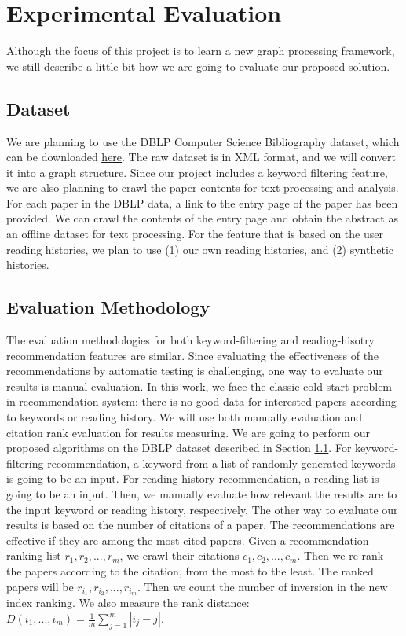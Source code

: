 \section{Experimental Evaluation}
%
Although the focus of this project is to learn a new graph processing framework, we still describe a little bit how we are going to evaluate our proposed solution.
%
\subsection{Dataset} \label{dataset}
%
We are planning to use the DBLP Computer Science Bibliography dataset, which can be downloaded \href{https://dblp.uni-trier.de/xml/}{\underline{here}}.
%
The raw dataset is in XML format, and we will convert it into a graph structure.
%
Since our project includes a keyword filtering feature, we are also planning to crawl the paper contents for text processing and analysis.
%
For each paper in the DBLP data, a link to the entry page of the paper has been provided.
%
We can crawl the contents of the entry page and obtain the abstract as an offline dataset for text processing.
%
For the feature that is based on the user reading histories, we plan to use (1) our own reading histories, and (2) synthetic histories.
%
\subsection{Evaluation Methodology}
%
The evaluation methodologies for both keyword-filtering and reading-hisotry recommendation features are similar.
%
Since evaluating the effectiveness of the recommendations by automatic testing is challenging, one way to evaluate our results is manual evaluation. In this work, we face the classic cold start problem in recommendation system: there is no good data for interested papers according to keywords or reading history. We will use both manually evaluation and citation rank evaluation for results measuring.
%
We are going to perform our proposed algorithms on the DBLP dataset described in Section \ref{dataset}.
%
For keyword-filtering recommendation, a keyword from a list of randomly generated keywords is going to be an input.
%
For reading-history recommendation, a reading list is going to be an input.
%
Then, we manually evaluate how relevant the results are to the input keyword or reading history, respectively.
%
The other way to evaluate our results is based on the number of citations of a paper. The recommendations are effective if they are among the most-cited papers.
%
Given a recommendation ranking list $r_1, r_2, ..., r_m$, we crawl their citations $c_1, c_2, ..., c_m$. Then we re-rank the papers according to the citation, from the most to the least. The ranked papers will be $r_{i_1}, r_{i_2},..., r_{i_m}$. Then we count the number of inversion in the new index ranking. We also measure the rank distance: $D(i_1, ..., i_m) = \frac{1}{m} \sum_{j=1}^m |i_j - j|$.
%


